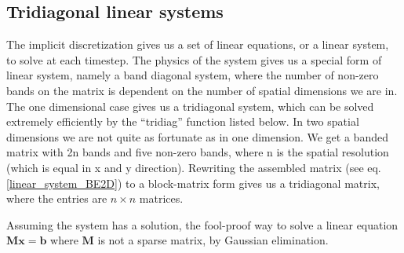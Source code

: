 \subsection{Tridiagonal linear systems}\label{tridiagonal_linear_systems}
The implicit discretization gives us a set of linear equations, or a linear system, to solve at each timestep. 
The physics of the system gives us a special form of linear system, namely a band diagonal system, where the number of non-zero bands on the matrix is dependent on the number of spatial dimensions we are in. 
The one dimensional case gives us a tridiagonal system, which can be solved extremely efficiently by the ``tridiag'' function listed below.
In two spatial dimensions we are not quite as fortunate as in one dimension. We get a banded matrix with 2n bands and five non-zero bands, where n is the spatial resolution (which is equal in x and y direction). 
Rewriting the assembled matrix (see eq. \ref{linear_system_BE2D}) to a block-matrix form gives us a tridiagonal matrix, where the entries are $n\times n$ matrices. 


Assuming the system has a solution, the fool-proof way to solve a linear equation $\mathbf{M}\mathbf{x} = \mathbf{b}$ where $\mathbf{M}$ is not a sparse matrix, by Gaussian elimination.

